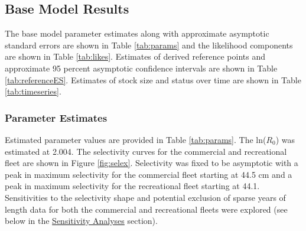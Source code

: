 \documentclass[11pt,
  english,
  a4paper,
]{article}
\begin{document}
\hypertarget{base-model-results}{%
\subsection{Base Model Results}\label{base-model-results}}

\leavevmode\tagmcend\tagstructend


The base model parameter estimates along with approximate asymptotic standard errors are shown in Table \ref{tab:params} and the likelihood components are shown in Table \ref{tab:likes}. Estimates of derived reference points and approximate 95 percent asymptotic confidence intervals are shown in Table \ref{tab:referenceES}. Estimates of stock size and status over time are shown in Table \ref{tab:timeseries}.

\leavevmode\tagmcend\tagstructend\par


\hypertarget{parameter-estimates}{%
\subsubsection{Parameter Estimates}\label{parameter-estimates}}

\leavevmode\tagmcend\tagstructend


Estimated parameter values are provided in Table \ref{tab:params}. The ln({\(R_0\)\leavevmode\tagmcend\tagstructend}) was estimated at 2.004. The selectivity curves for the commercial and recreational fleet are shown in Figure \ref{fig:selex}. Selectivity was fixed to be asymptotic with a peak in maximum selectivity for the commercial fleet starting at 44.5 cm and a peak in maximum selectivity for the recreational fleet starting at 44.1. Sensitivities to the selectivity shape and potential exclusion of sparse years of length data for both the commercial and recreational fleets were explored (see below in the {\protect\hyperlink{sensitivity-analyses}{Sensitivity Analyses}\leavevmode\tagmcend\tagstructend} section).

\leavevmode\tagmcend\tagstructend\par

\end{document}
